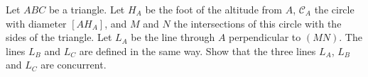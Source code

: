 Let $ABC$ be a triangle. Let $H_A$ be the foot of the altitude from $A$, $\mathcal{C}_A$ the circle with diameter $[AH_A]$, and $M$ and $N$ the intersections of this circle with the sides of the triangle. Let $L_A$ be the line through $A$ perpendicular to $(MN)$. The lines $L_B$ and $L_C$ are defined in the same way. Show that the three lines $L_A$, $L_B$ and $L_C$ are concurrent.
